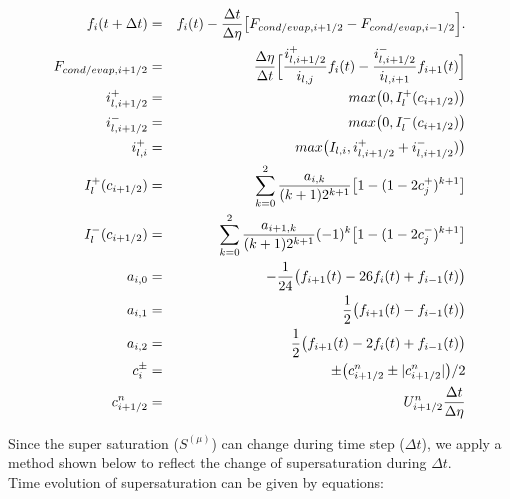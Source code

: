 \begin{eqnarray}
f_{i}(t+\Delta t)&=&f_{i}(t)-\frac{\Delta t}{\Delta \eta}\bigl [F_{cond/evap,i+1/2}-F_{cond/evap,i-1/2}\Bigr ].\nonumber\\
F_{cond/evap,i+1/2}&=&\frac{\Delta \eta}{\Delta t}\Bigl[ \frac{i^{+}_{l,i+1/2}}{i_{l,j}}f_{i}(t)-\frac{i^{-}_{l,i+1/2}}{i_{l,i+1}}f_{i+1}(t)\Bigr ]\nonumber\\
i^{+}_{l,i+1/2}&=&max\bigl(0,I^{+}_{l}(c_{i+1/2})\bigr)\nonumber\\
i^{-}_{l,i+1/2}&=&max\bigl(0,I^{-}_{l}(c_{i+1/2})\bigr)\nonumber\\
i^{+}_{l,i}&=&max\bigl(I_{l,i},i^{+}_{l,i+1/2}+i^{-}_{l,i+1/2})\bigr)\nonumber\\
I^{+}_{l}(c_{i+1/2})&=&\sum_{k=0}^{2}\frac{a_{i,k}}{(k+1)2^{k+1}}\bigl[1-(1-2c^{+}_{j})^{k+1}\bigr]\nonumber\\
I^{-}_{l}(c_{i+1/2})&=&\sum_{k=0}^{2}\frac{a_{i+1,k}}{(k+1)2^{k+1}}(-1)^{k}\bigl[1-(1-2c^{-}_{j})^{k+1}\bigr]\nonumber\\
a_{i,0}&=&-\frac{1}{24}\bigl( f_{i+1}(t)-26f_{i}(t)+f_{i-1}(t) \bigr)\nonumber\\
a_{i,1}&=&\frac{1}{2}\bigl( f_{i+1}(t)-f_{i-1}(t) \bigr)\nonumber\\
a_{i,2}&=&\frac{1}{2}\bigl( f_{i+1}(t)-2f_{i}(t)+f_{i-1}(t) \bigr)\nonumber\\
c_{i}^{\pm}&=&\pm\bigl( c^{n}_{i+1/2}\pm | c^{n}_{i+1/2}|\bigr )/2\nonumber\\
c^{n}_{i+1/2}&=&U^{n}_{i+1/2}\frac{\Delta t}{\Delta \eta}
\end{eqnarray}

Since the super saturation ($S^{(\mu)}$) can change during time step ($\Delta t$), we apply a method shown below to reflect the change of supersaturation during $\Delta t$.\\
Time evolution of supersaturation can be given by equations:

